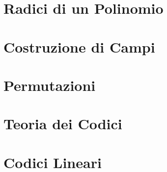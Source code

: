 \documentclass[a4paper,12pt, oneside]{book}
\begin{document}
\chapter{Radici di un Polinomio}
\chapter{Costruzione di Campi}
\chapter{Permutazioni}
\chapter{Teoria dei Codici}
\chapter{Codici Lineari}
\end{document}
